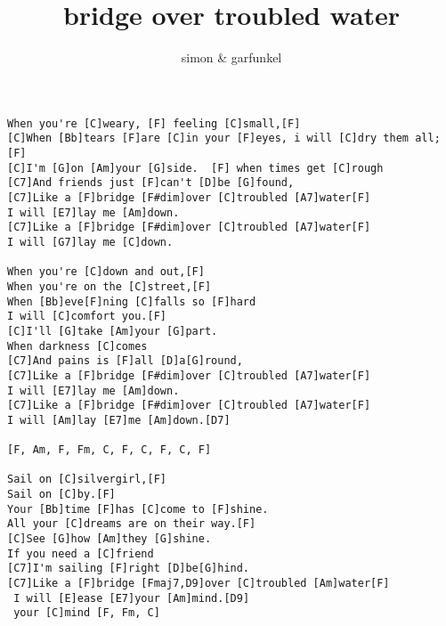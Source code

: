 \author{simon \& garfunkel}
\title{bridge over troubled water}
\maketitle
\begin{verbatim}
When you're [C]weary, [F] feeling [C]small,[F]
[C]When [Bb]tears [F]are [C]in your [F]eyes, i will [C]dry them all; [F]
[C]I'm [G]on [Am]your [G]side.  [F] when times get [C]rough
[C7]And friends just [F]can't [D]be [G]found,
[C7]Like a [F]bridge [F#dim]over [C]troubled [A7]water[F]
I will [E7]lay me [Am]down.
[C7]Like a [F]bridge [F#dim]over [C]troubled [A7]water[F]
I will [G7]lay me [C]down.

When you're [C]down and out,[F]
When you're on the [C]street,[F]
When [Bb]eve[F]ning [C]falls so [F]hard
I will [C]comfort you.[F]
[C]I'll [G]take [Am]your [G]part.
When darkness [C]comes
[C7]And pains is [F]all [D]a[G]round,
[C7]Like a [F]bridge [F#dim]over [C]troubled [A7]water[F]
I will [E7]lay me [Am]down.
[C7]Like a [F]bridge [F#dim]over [C]troubled [A7]water[F]
I will [Am]lay [E7]me [Am]down.[D7]

[F, Am, F, Fm, C, F, C, F, C, F]

Sail on [C]silvergirl,[F]
Sail on [C]by.[F]
Your [Bb]time [F]has [C]come to [F]shine.
All your [C]dreams are on their way.[F]
[C]See [G]how [Am]they [G]shine.
If you need a [C]friend
[C7]I'm sailing [F]right [D]be[G]hind.
[C7]Like a [F]bridge [Fmaj7,D9]over [C]troubled [Am]water[F]
 I will [E]ease [E7]your [Am]mind.[D9]
 your [C]mind [F, Fm, C]
\end{verbatim}